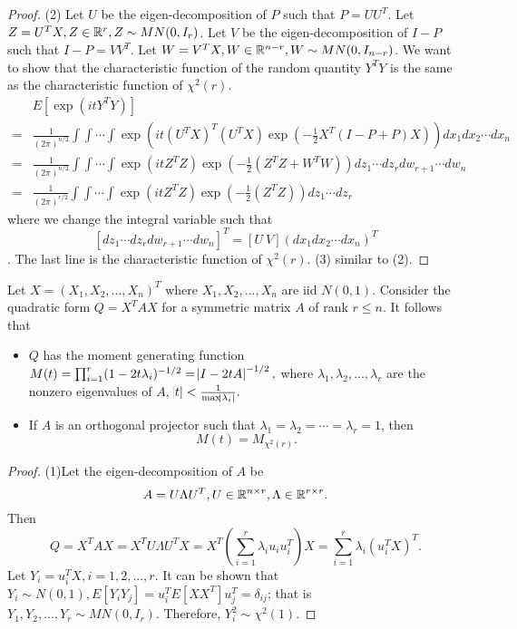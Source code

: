 \begin{refsection}
\begin{proof}
(2) Let $U$ be the eigen-decomposition of $P$ such that $P = UU^T$. Let $Z = U^TX, Z\in \mathbb{R}^r, Z\sim MN(0, I_r)$. Let $V$  be the eigen-decomposition of $I-P$ such that $I-P = VV^T$. Let $W = V^TX, W\in \mathbb{R}^{n-r}, W\sim MN(0, I_{n-r})$. We want to show that the characteristic function of the random quantity $Y^TY$ is the same as the characteristic function of $\chi^2(r)$. 
\begin{align*}
&E[\exp(itY^TY)] \\
=&\frac{1}{(2\pi)^{n/2}}\int\int\cdots \int \exp(it(U^TX)^T(U^TX) \exp(-\frac{1}{2}X^T(I-P + P) X))dx_1dx_2\cdots dx_n \\
=&\frac{1}{(2\pi)^{n/2}}\int\int\cdots \int \exp(itZ^TZ) \exp(-\frac{1}{2}(Z^TZ + W^TW))dz_1\cdots dz_r dw_{r+1}\cdots dw_n \\
=&\frac{1}{(2\pi)^{r/2}}\int\int\cdots \int \exp(itZ^TZ) \exp(-\frac{1}{2}(Z^TZ))dz_1\cdots dz_r
\end{align*}
where we change the integral variable such that $$[dz_1\cdots dz_r dw_{r+1}\cdots dw_n]^T = [U~ V](dx_1 dx_2 \cdots dx_n)^T$$. The last line is the characteristic function of  $\chi^2(r)$.
(3) similar to (2).
\end{proof}


\begin{lemma}\cite[523]{hoggintroduction}\label{ch:theory-of-statistics:th:momentGeneratingFunctionGaussianQuadraticForm}
Let $X=(X_1,X_2,...,X_n)^T$ where $X_1,X_2,...,X_n$ are iid $N(0,1)$. Consider the quadratic form $Q = X^TAX$ for a symmetric matrix $A$ of rank $r\leq n$. 
It follows that
\begin{itemize}
	\item $Q$ has the moment generating function $M(t) = \prod_{i=1}^r (1 - 2t\lambda_i)^{-1/2} = \abs{I - 2tA}^{-1/2},$
	where $\lambda_1,\lambda_2,...,\lambda_r$ are the nonzero eigenvalues of $A$, $\abs{t} < \frac{1}{\max \abs{\lambda_i}}.$
	\item If $A$ is an orthogonal projector such that $\lambda_1=\lambda_2=\cdots = \lambda_r = 1$, then
	$$M(t) = M_{\chi^2(r)}.$$
\end{itemize}
\end{lemma}
\begin{proof}
(1)Let the eigen-decomposition of $A$ be $$A = U\Lambda U^T, U\in \mathbb{R}^{n\times r}, \Lambda \in \mathbb{R}^{r\times r}.$$
Then 
$$Q = X^TAX = X^TU\Lambda U^TX = X^T(\sum_{i=1}^r \lambda_i u_iu_i^T) X =\sum_{i=1}^r \lambda_i (u_i^T X)^T.$$
Let $Y_i=u_i^T X,i=1,2,...,r$. It can be shown that $Y_i\sim N(0,1), E[Y_iY_j] = u_i^T E[XX^T]u_j^T = \delta_{ij}$; that is $Y_1,Y_2,...,Y_r \sim MN(0,I_r).$ 
Therefore, $Y_i^2 \sim \chi^2(1).$


\end{proof}
\end{refsection}
